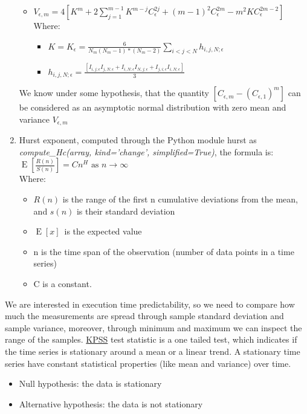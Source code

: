 \begin{enumerate}
\begin{itemize}
		\item $V_{\epsilon,m} = 4[{K}^{m} + 2\sum_{j=1}^{m-1}{K}^{m-j}{C}^{2j}_\epsilon + {(m-1)}^{2}{C}^{2m}_\epsilon - {m}^{2}K{C}^{2m-2}_\epsilon]$
		Where:
		\begin{itemize}
			\item $K=K_\epsilon = \frac{6}{N_m(N_m-1)*(N_m-2)}\sum_{i<j<N}h_{i,j,N;\epsilon}$
			\item $h_{i,j,N;\epsilon} = \frac{[I_{i,j;\epsilon}I_{j,N;\epsilon}+I_{i,N;\epsilon}I_{N,j;\epsilon}+I_{j,i;\epsilon}I_{i,N;\epsilon}]}{3}$
		\end{itemize}
	\end{itemize}
	We know under some hypothesis, that the quantity $[C_{\epsilon,m}-{(C_{\epsilon,1})}^{m}]$ can be considered as an asymptotic normal distribution with zero mean and variance $V_{\epsilon,m}$
	\item Hurst exponent, computed through the Python module hurst as \textit{compute\_Hc(array, kind='change', simplified=True)}, the formula is:\\[0.5cm]
	$\operatorname{E} \left [ \frac{R(n)}{S(n)} \right ]=C n^H  \text{  as } n \to \infty  \, $
	\\[0.5cm] Where:
	\begin{itemize}
		\item $R(n)$ is the range of the first n cumulative deviations from the mean, and $s(n)$ is their standard deviation
		\item $\operatorname{E} \left [x \right ] \,$ is the expected value
		\item n is the time span of the observation (number of data points in a time series)
		\item C is a constant.
	\end{itemize}
\end{enumerate}
We are interested in execution time predictability, so we need to compare how much the measurements are spread through sample standard deviation and sample variance, moreover, through minimum and maximum we can inspect the range of the samples.
\href{http://debis.deu.edu.tr/userweb//onder.hanedar/dosyalar/kpss.pdf}{KPSS} test statistic is a one tailed test, which indicates if the time series is stationary around a mean or a linear trend. A stationary time series have constant statistical properties (like mean and variance) over time.
\begin{itemize}
	\item Null hypothesis: the data is stationary
	\item Alternative hypothesis: the data is not stationary
\end{itemize}
